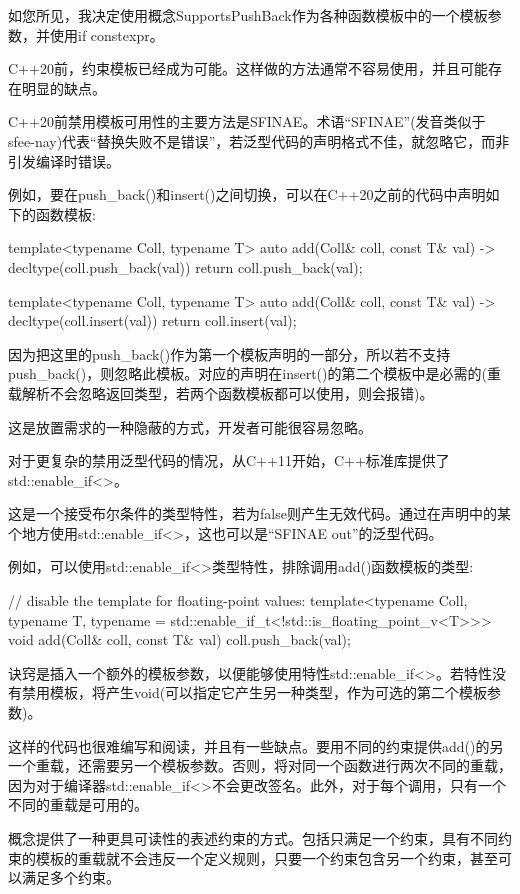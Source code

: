 如您所见，我决定使用概念SupportsPushBack作为各种函数模板中的一个模板参数，并使用if constexpr。


C++20前，约束模板已经成为可能。这样做的方法通常不容易使用，并且可能存在明显的缺点。


C++20前禁用模板可用性的主要方法是SFINAE。术语“SFINAE”(发音类似于sfee-nay)代表“替换失败不是错误”，若泛型代码的声明格式不佳，就忽略它，而非引发编译时错误。

例如，要在push\_back()和insert()之间切换，可以在C++20之前的代码中声明如下的函数模板:

\begin{cpp}
template<typename Coll, typename T>
auto add(Coll& coll, const T& val) -> decltype(coll.push_back(val))
{
	return coll.push_back(val);
}

template<typename Coll, typename T>
auto add(Coll& coll, const T& val) -> decltype(coll.insert(val))
{
	return coll.insert(val);
}
\end{cpp}

因为把这里的push\_back()作为第一个模板声明的一部分，所以若不支持push\_back()，则忽略此模板。对应的声明在insert()的第二个模板中是必需的(重载解析不会忽略返回类型，若两个函数模板都可以使用，则会报错)。

这是放置需求的一种隐蔽的方式，开发者可能很容易忽略。


对于更复杂的禁用泛型代码的情况，从C++11开始，C++标准库提供了std::enable\_if<>。

这是一个接受布尔条件的类型特性，若为false则产生无效代码。通过在声明中的某个地方使用std::enable\_if<>，这也可以是“SFINAE out”的泛型代码。

例如，可以使用std::enable\_if<>类型特性，排除调用add()函数模板的类型:

\begin{cpp}
// disable the template for floating-point values:
template<typename Coll, typename T,
typename = std::enable_if_t<!std::is_floating_point_v<T>>>
void add(Coll& coll, const T& val)
{
	coll.push_back(val);
}
\end{cpp}

诀窍是插入一个额外的模板参数，以便能够使用特性std::enable\_if<>。若特性没有禁用模板，将产生void(可以指定它产生另一种类型，作为可选的第二个模板参数)。

这样的代码也很难编写和阅读，并且有一些缺点。要用不同的约束提供add()的另一个重载，还需要另一个模板参数。否则，将对同一个函数进行两次不同的重载，因为对于编译器std::enable\_if<>不会更改签名。此外，对于每个调用，只有一个不同的重载是可用的。

概念提供了一种更具可读性的表述约束的方式。包括只满足一个约束，具有不同约束的模板的重载就不会违反一个定义规则，只要一个约束包含另一个约束，甚至可以满足多个约束。




